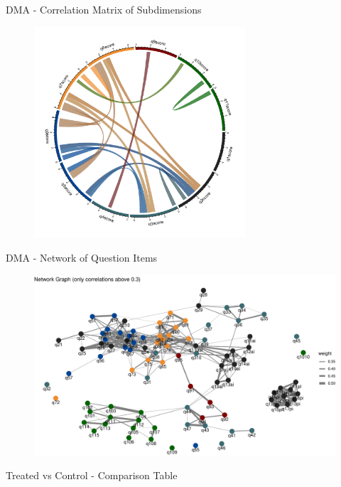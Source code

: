 \documentclass{beamer}
\begin{document}
    \begin{frame}{DMA - Correlation Matrix of Subdimensions}
        \begin{figure}
        \centering
        \includegraphics[width=0.7\textwidth]{../Output/thesmallcorrmatrix_plot.png}
    \end{figure}
    \end{frame}

    \begin{frame}{DMA - Network of Question Items}
        \begin{figure}
            \centering
            \includegraphics[width=\textwidth]{../Output/network_graph.pdf}
        \end{figure}
    \end{frame}

    \begin{frame}{Treated vs Control - Comparison Table}
        
    \end{frame}
\end{document}
